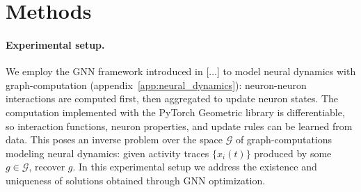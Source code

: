 \documentclass[10pt,twocolumn]{article}
\begin{document}
\section{Methods}

\paragraph{Experimental setup.}
We employ the GNN framework introduced in [...] to model neural dynamics with graph-computation (appendix~\ref{app:neural_dynamics}): neuron-neuron interactions are computed first, then aggregated to update neuron states. The computation implemented with the PyTorch Geometric library \citep{fey_fast_2019} is differentiable, so interaction functions, neuron properties, and update rules can be learned from data. This poses an inverse problem over the space $\mathcal{G}$ of graph-computations modeling neural dynamics: given activity traces $\{x_i(t)\}$ produced by some $g \in \mathcal{G}$, recover $g$. In this experimental setup we address the existence and uniqueness of solutions obtained through GNN optimization.
\end{document}
